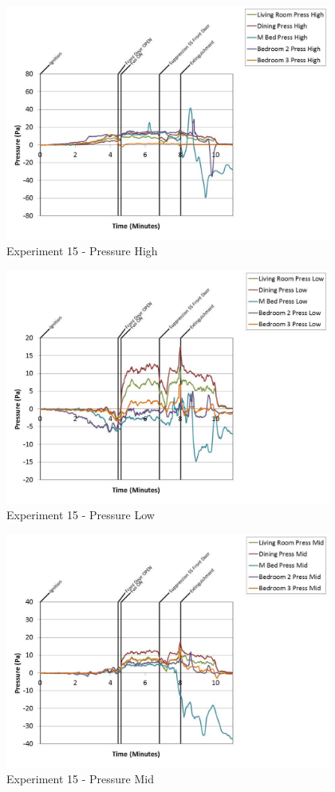 \documentclass{article}
\begin{document}
\begin{appendices}
	\begin{figure}[h!]
		\centering
		\includegraphics[height=3.05in]{0_Images/Results_Charts/Exp_15_Charts/PressureHigh.pdf}
		\caption{Experiment 15 - Pressure High}
	\end{figure}
 
	\clearpage

	\begin{figure}[h!]
		\centering
		\includegraphics[height=3.05in]{0_Images/Results_Charts/Exp_15_Charts/PressureLow.pdf}
		\caption{Experiment 15 - Pressure Low}
	\end{figure}
 

	\begin{figure}[h!]
		\centering
		\includegraphics[height=3.05in]{0_Images/Results_Charts/Exp_15_Charts/PressureMid.pdf}
		\caption{Experiment 15 - Pressure Mid}
	\end{figure}
 

\end{appendices}
\end{document}

